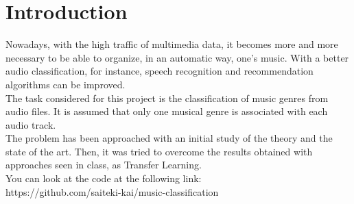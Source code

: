\section{Introduction}
Nowadays, with the high traffic of multimedia data, it becomes more and more 
necessary to be able to organize, in an automatic way, one's music. 
With a better audio classification, for instance, speech recognition and recommendation algorithms can be improved. \\

The task considered for this project is the classification of music 
genres from audio files.
It is assumed that only one musical genre is associated with each audio track. \\

The problem has been approached with an initial study of the theory and the state of the art. 
Then, it was tried to overcome the results obtained with approaches seen in class, as Transfer Learning. \\

You can look at the code at the following link: \\
{https://github.com/saiteki-kai/music-classification}